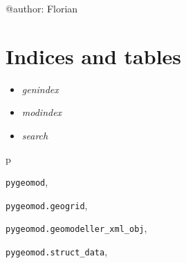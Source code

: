 \documentclass[letterpaper,10pt,english]{sphinxmanual}
\begin{document}
@author: Florian


\chapter{Indices and tables}
\label{index:indices-and-tables}\begin{itemize}
\item {} 
\emph{genindex}

\item {} 
\emph{modindex}

\item {} 
\emph{search}

\end{itemize}


\renewcommand{\indexname}{Python Module Index}
\begin{theindex}
\def\bigletter#1{{\Large\sffamily#1}\nopagebreak\vspace{1mm}}
\bigletter{p}
\item {\texttt{pygeomod}}, \pageref{pygeomod:module-pygeomod}
\item {\texttt{pygeomod.geogrid}}, \pageref{pygeomod:module-pygeomod.geogrid}
\item {\texttt{pygeomod.geomodeller\_xml\_obj}}, \pageref{pygeomod:module-pygeomod.geomodeller_xml_obj}
\item {\texttt{pygeomod.struct\_data}}, \pageref{pygeomod:module-pygeomod.struct_data}
\end{theindex}

\renewcommand{\indexname}{Index}
\printindex
\end{document}
